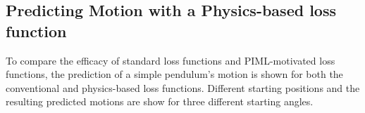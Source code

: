 \documentclass[3p]{elsarticle}
\begin{document}
\subsection{Predicting Motion with a Physics-based loss function}
To compare the efficacy of standard loss functions and PIML-motivated loss functions, the prediction of a simple pendulum's motion is shown for both the conventional and physics-based loss functions. Different starting positions and the resulting predicted motions are show for three different starting angles.
\end{document}
